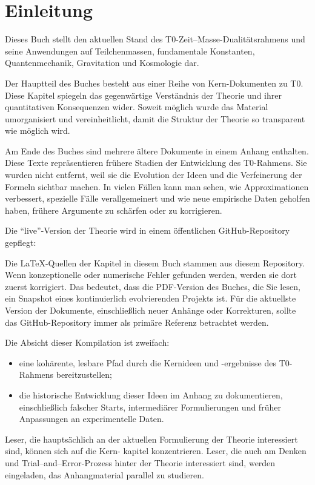 \chapter*{Einleitung}
	
	Dieses Buch stellt den aktuellen Stand des T0-Zeit--Masse-Dualitätsrahmens und seine Anwendungen auf
	Teilchenmassen, fundamentale Konstanten, Quantenmechanik, Gravitation und Kosmologie dar.
	
	Der Hauptteil des Buches besteht aus einer Reihe von Kern-Dokumenten zu T0. Diese Kapitel spiegeln das
	gegenwärtige Verständnis der Theorie und ihrer quantitativen Konsequenzen wider. Soweit möglich wurde
	das Material umorganisiert und vereinheitlicht, damit die Struktur der Theorie so transparent
	wie möglich wird.
	
	Am Ende des Buches sind mehrere ältere Dokumente in einem Anhang enthalten. Diese Texte repräsentieren
	frühere Stadien der Entwicklung des T0-Rahmens. Sie wurden nicht entfernt, weil sie die
	Evolution der Ideen und die Verfeinerung der Formeln sichtbar machen. In vielen Fällen kann man
	sehen, wie Approximationen verbessert, spezielle Fälle verallgemeinert und wie neue empirische Daten
	geholfen haben, frühere Argumente zu schärfen oder zu korrigieren.
	
	Die ``live''-Version der Theorie wird in einem öffentlichen GitHub-Repository gepflegt:
	
	\begin{center}
	\end{center}
	
	Die LaTeX-Quellen der Kapitel in diesem Buch stammen aus diesem Repository. Wenn konzeptionelle oder
	numerische Fehler gefunden werden, werden sie dort zuerst korrigiert. Das bedeutet, dass die PDF-Version des
	Buches, die Sie lesen, ein Snapshot eines kontinuierlich evolvierenden Projekts ist. Für die aktuellste Version
	der Dokumente, einschließlich neuer Anhänge oder Korrekturen, sollte das GitHub-Repository immer als
	primäre Referenz betrachtet werden.
	
	Die Absicht dieser Kompilation ist zweifach:
	\begin{itemize}
		\item eine kohärente, lesbare Pfad durch die Kernideen und -ergebnisse des T0-Rahmens bereitzustellen;
		\item die historische Entwicklung dieser Ideen im Anhang zu dokumentieren, einschließlich falscher
		Starts, intermediärer Formulierungen und früher Anpassungen an experimentelle Daten.
	\end{itemize}
	
	Leser, die hauptsächlich an der aktuellen Formulierung der Theorie interessiert sind, können sich auf die Kern-
	kapitel konzentrieren. Leser, die auch am Denken und Trial--and--Error-Prozess hinter der Theorie interessiert
	sind, werden eingeladen, das Anhangmaterial parallel zu studieren.
	